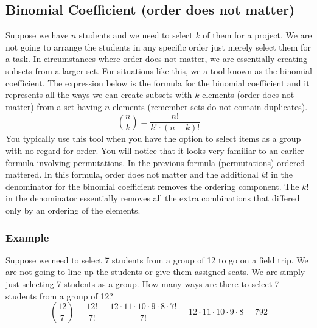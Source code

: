\subsection*{Binomial Coefficient (order does not matter)}
Suppose we have $n$ students and we need to select $k$ of them for a project.  We are not going to arrange the students in any specific order just merely select them for a task.  In circumstances where order does not matter, we are essentially creating subsets from a larger set.  For situations like this, we a tool known as the binomial coefficient.  The expression below is the formula for the binomial coefficient and it represents all the ways we can create subsets with $k$ elements (order does not matter) from a set having $n$ elements (remember sets do not contain duplicates).
$$\binom{n}{k} = \frac{n!}{k! \cdot (n-k)!}$$
You typically use this tool when you have the option to select items as a group with no regard for order.  You will notice that it looks very familiar to an earlier formula involving permutations.  In the previous formula (permutations) ordered mattered.  In this formula, order does not matter and the additional $k!$ in the denominator for the binomial coefficient removes the ordering component.  The $k!$ in the denominator essentially removes all the extra combinations that differed only by an ordering of the elements.

\subsubsection*{Example}
Suppose we need to select 7 students from a group of 12 to go on a field trip.  We are not going to line up the students or give them assigned seats.   We are simply just selecting 7 students as a group.   How many ways are there to select 7 students from a group of 12?
$$\binom{12}{7} = \frac{12!}{7!} = \frac{12 \cdot 11 \cdot 10 \cdot 9 \cdot 8 \cdot 7!}{7!} = 12 \cdot 11 \cdot 10 \cdot 9 \cdot 8 = 792$$

